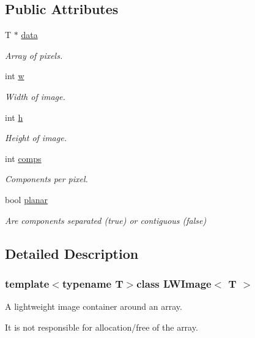 \subsection*{Public Attributes}
\begin{DoxyCompactItemize}
\item 
T $\ast$ \hyperlink{classLWImage_a97a679b4f4133084fc8afbaa029c3fef}{data}
\begin{DoxyCompactList}\small\item\em Array of pixels. \end{DoxyCompactList}\item 
int \hyperlink{classLWImage_a5d5ffb936fcfa5c1459430af6f762baa}{w}
\begin{DoxyCompactList}\small\item\em Width of image. \end{DoxyCompactList}\item 
int \hyperlink{classLWImage_a2b5a9db633a94baec577a6db13a96240}{h}
\begin{DoxyCompactList}\small\item\em Height of image. \end{DoxyCompactList}\item 
int \hyperlink{classLWImage_afe32b723621c8269897d9a58255bfa86}{comps}
\begin{DoxyCompactList}\small\item\em Components per pixel. \end{DoxyCompactList}\item 
bool \hyperlink{classLWImage_ae63104e4602e8801d97407207103728c}{planar}
\begin{DoxyCompactList}\small\item\em Are components separated (true) or contiguous (false) \end{DoxyCompactList}\end{DoxyCompactItemize}


\subsection{Detailed Description}
\subsubsection*{template$<$typename T$>$class L\+W\+Image$<$ T $>$}

A lightweight image container around an array. 

It is not responsible for allocation/free of the array. 

